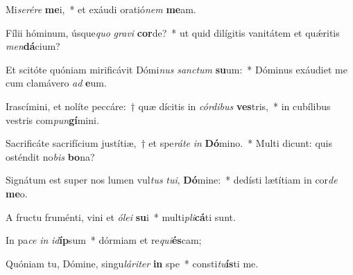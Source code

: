 \item Mi\textit{se}\textit{ré}\textit{re} \textbf{me}i,~* et exáudi oratió\textit{nem} \textbf{me}am.
\item Fílii hóminum, úsque\textit{quo} \textit{gra}\textit{vi} \textbf{cor}de?~* ut quid dilígitis vanitátem et quǽritis \textit{men}\textbf{dá}cium?
\item Et scitóte quóniam mirificávit Dómi\textit{nus} \textit{sanc}\textit{tum} \textbf{su}um:~* Dóminus exáudiet me cum clamávero \textit{ad} \textbf{e}um.
\item Irascímini, et nolíte peccáre:~† quæ dícitis in \textit{cór}\textit{di}\textit{bus} \textbf{ves}tris,~* in cubílibus vestris com\textit{pun}\textbf{gí}mini.
\item Sacrificáte sacrifícium justítiæ,~† et spe\textit{rá}\textit{te} \textit{in} \textbf{Dó}mino.~* Multi dicunt: quis osténdit no\textit{bis} \textbf{bo}na?
\item Signátum est super nos lumen vul\textit{tus} \textit{tu}\textit{i}, \textbf{Dó}mine:~* dedísti lætítiam in cor\textit{de} \textbf{me}o.
\item A fructu fruménti, vini et \textit{ó}\textit{le}\textit{i} \textbf{su}i~* multi\textit{pli}\textbf{cá}ti sunt.
\item In pa\textit{ce} \textit{in} \textit{id}\textbf{íp}sum~* dórmiam et re\textit{qui}\textbf{és}cam;
\item Quóniam tu, Dómine, singu\textit{lá}\textit{ri}\textit{ter} \textbf{in} spe~* consti\textit{tu}\textbf{ís}ti me.
